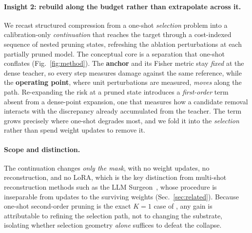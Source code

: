 \paragraph{Insight 2: rebuild along the budget rather than extrapolate across it.} We recast structured compression from a one-shot \emph{selection} problem into a calibration-only \emph{continuation} that reaches the target through a cost-indexed sequence of nested pruning states, refreshing the ablation perturbations at each partially pruned model. The conceptual core is a separation that one-shot conflates (Fig.~\ref{fig:method}). The \textbf{anchor} and its Fisher metric stay \emph{fixed} at the dense teacher, so every step measures damage against the same reference, while the \textbf{operating point}, where unit perturbations are measured, \emph{moves} along the path. Re-expanding the risk at a pruned state introduces a \emph{first-order} term absent from a dense-point expansion, one that measures how a candidate removal interacts with the discrepancy already accumulated from the teacher. The term grows precisely where one-shot degrades most, and we fold it into the \emph{selection} rather than spend weight updates to remove it.

\paragraph{Scope and distinction.}
The continuation changes \emph{only the mask}, with no weight updates, no reconstruction, and no LoRA, which is the key distinction from multi-shot reconstruction methods such as the LLM Surgeon~\citep{ouderaa2024llmsurgeon}, whose procedure is inseparable from updates to the surviving weights (Sec.~\ref{sec:related}).
Because one-shot second-order pruning is the exact $K{=}1$ case of \method, any gain is attributable to refining the selection path, not to changing the substrate, isolating whether selection geometry \emph{alone} suffices to defeat the collapse.

